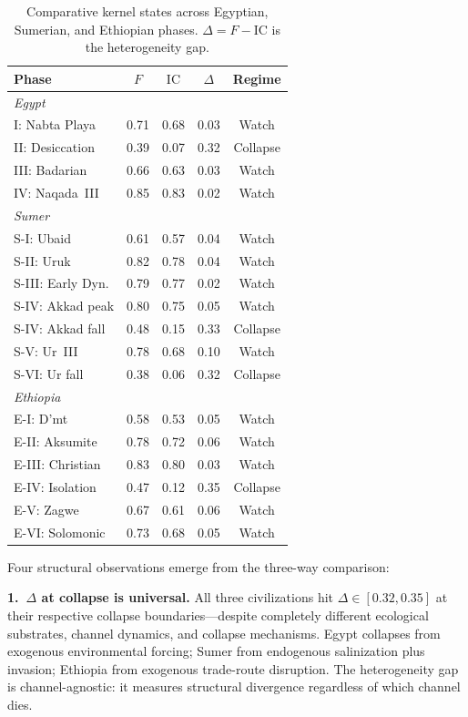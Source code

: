 \documentclass[
  aps,
  prd,
  twocolumn,
  superscriptaddress,
  nofootinbib,
  floatfix
]{revtex4-2}
\newcommand{\IC}{\mathrm{IC}}
\begin{document}
\begin{table}[h]
\centering
\caption{Comparative kernel states across Egyptian,
Sumerian, and Ethiopian phases.  $\Delta = F - \IC$
is the heterogeneity gap.}
\label{tab:comparative}
\begin{tabular}{@{}lcccc@{}}
\toprule
Phase & $F$ & $\IC$ & $\Delta$ & Regime \\
\midrule
\multicolumn{5}{l}{\emph{Egypt}} \\
\quad I: Nabta Playa & 0.71 & 0.68 & 0.03 & Watch \\
\quad II: Desiccation & 0.39 & 0.07 & 0.32 & Collapse \\
\quad III: Badarian & 0.66 & 0.63 & 0.03 & Watch \\
\quad IV: Naqada~III & 0.85 & 0.83 & 0.02 & Watch \\
\midrule
\multicolumn{5}{l}{\emph{Sumer}} \\
\quad S-I: Ubaid & 0.61 & 0.57 & 0.04 & Watch \\
\quad S-II: Uruk & 0.82 & 0.78 & 0.04 & Watch \\
\quad S-III: Early Dyn. & 0.79 & 0.77 & 0.02 & Watch \\
\quad S-IV: Akkad peak & 0.80 & 0.75 & 0.05 & Watch \\
\quad S-IV: Akkad fall & 0.48 & 0.15 & 0.33 & Collapse \\
\quad S-V: Ur~III & 0.78 & 0.68 & 0.10 & Watch \\
\quad S-VI: Ur fall & 0.38 & 0.06 & 0.32 & Collapse \\
\midrule
\multicolumn{5}{l}{\emph{Ethiopia}} \\
\quad E-I: D'mt & 0.58 & 0.53 & 0.05 & Watch \\
\quad E-II: Aksumite & 0.78 & 0.72 & 0.06 & Watch \\
\quad E-III: Christian & 0.83 & 0.80 & 0.03 & Watch \\
\quad E-IV: Isolation & 0.47 & 0.12 & 0.35 & Collapse \\
\quad E-V: Zagwe & 0.67 & 0.61 & 0.06 & Watch \\
\quad E-VI: Solomonic & 0.73 & 0.68 & 0.05 & Watch \\
\bottomrule
\end{tabular}
\end{table}

Four structural observations emerge from the
three-way comparison:

\textbf{1.~$\Delta$ at collapse is universal.}  All
three civilizations hit $\Delta \in [0.32, 0.35]$ at
their respective collapse boundaries---despite
completely different ecological substrates, channel
dynamics, and collapse mechanisms.  Egypt collapses
from exogenous environmental forcing; Sumer from
endogenous salinization plus invasion; Ethiopia from
exogenous trade-route disruption.  The heterogeneity
gap is channel-agnostic: it measures structural
divergence regardless of which channel dies.
\end{document}
